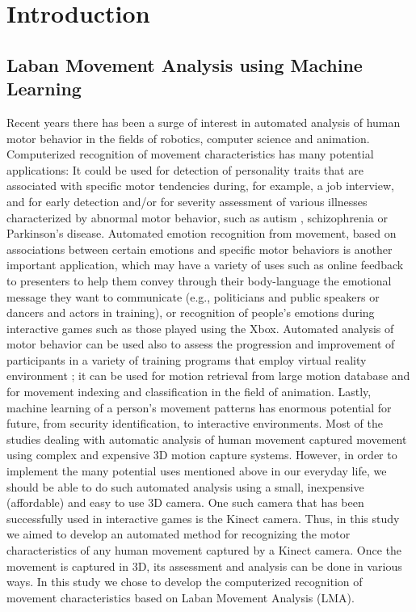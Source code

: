 

\chapter{Introduction}
\label{chap:intro}

\section{Laban Movement Analysis using Machine Learning}
Recent years there has been a surge of interest in automated analysis of
human motor behavior in the fields of robotics, computer science and animation.
Computerized recognition of movement characteristics has many potential
applications: It could be used for detection of personality traits that are
associated with specific motor tendencies \cite{levy2003use} during, for
example, a job interview, and for early detection and/or for severity assessment
of various illnesses characterized by abnormal motor behavior, such as autism
\cite{dott1995aesthetic} , schizophrenia or Parkinson's disease. Automated
emotion recognition from movement, based on associations between certain
emotions and specific motor behaviors \cite{aristidou2015emotion} is another
important application, which may have a variety of uses such as online feedback
to presenters to help them convey through their body-language the emotional
message they want to communicate (e.g., politicians and public speakers or
dancers and actors in training), or recognition of people's emotions during
interactive games such as those played using the Xbox. Automated analysis of
motor behavior can be used also to assess the progression and improvement of
participants in a variety of training programs that employ virtual reality
environment \cite{aristidou2013motion};  it can be used for motion retrieval
from large motion database \cite{kapadia2013efficient} and for movement indexing
and classification \cite{aristidou2013motion} in the field of animation. Lastly,
machine learning of a person's movement patterns has enormous potential for
future, from security identification, to interactive environments. Most of the
studies dealing with automatic analysis of human movement captured 
movement using complex and expensive 3D motion capture systems. However, in
order to implement the many potential uses mentioned above in our everyday life,
we should be able to do such automated analysis using a small, inexpensive
(affordable) and easy to use 3D camera. One such camera that has been
successfully used in interactive games is the Kinect camera. Thus, in this study
we aimed to develop an automated method for recognizing the motor
characteristics of any human movement captured by a Kinect camera. Once the
movement is captured in 3D, its assessment and analysis can be done in various
ways. In this study we chose to develop the computerized recognition of movement
characteristics based on Laban Movement Analysis (LMA).



